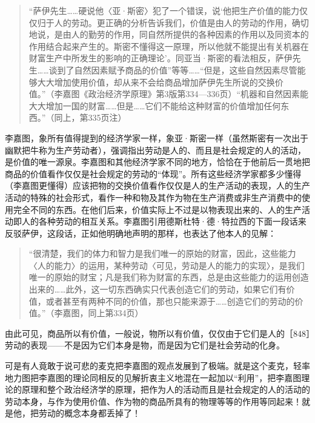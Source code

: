 \begin{quote}{“萨伊先生……硬说他〈亚·斯密〉犯了一个错误，说‘他把生产价值的能力仅仅归于人的劳动。更正确的分析告诉我们，价值是由人的劳动的作用，确切地说，是由人的勤劳的作用，同自然所提供的各种因素的作用以及同资本的作用结合起来产生的。斯密不懂得这一原理，所以他就不能提出有关机器在财富生产中所发生的影响的正确理论’。同亚当·斯密的看法相反，萨伊先生……谈到了自然因素赋予商品的价值”等等……“但是，这些自然因素尽管能够大大增加使用价值，却从来不会给商品增加萨伊先生所说的交换价值。”（李嘉图《政治经济学原理》第3版第334—336页）“机器和自然因素能大大增加一国的财富……但是……它们不能给这种财富的价值增加任何东西。”（同上，第335页注）}\end{quote}

李嘉图，象所有值得提到的经济学家一样，象亚·斯密一样（虽然斯密有一次出于幽默把牛称为生产劳动者），强调指出劳动是人的、而且是社会规定的人的活动，是价值的唯一源泉。李嘉图和其他经济学家不同的地方，恰恰在于他前后一贯地把商品的价值看作仅仅是社会规定的劳动的“体现”。所有这些经济学家都多少懂得（李嘉图更懂得）应该把物的交换价值看作仅仅是人的生产活动的表现，人的生产活动的特殊的社会形式，看作一种和物及其作为物在生产消费或非生产消费中的使用完全不同的东西。在他们后来，价值实际上不过是以物表现出来的、人的生产活动即人的各种劳动的相互关系。李嘉图引用德斯杜特·德·特拉西的下面一段话来反驳萨伊，这段话，正如他明确地声明的那样，也表达了他本人的见解：

\begin{quote}{“很清楚，我们的体力和智力是我们唯一的原始的财富，因此，这些能力〈人的能力〉的运用，某种劳动〈可见，劳动是人的能力的实现〉，是我们唯一的原始的财宝；凡是我们称为财富的东西，总是由这些能力的运用创造出来的……此外，这一切东西确实只代表创造它们的劳动，如果它们有价值，或者甚至有两种不同的价值，那也只能来源于……创造它们的劳动的价值。”（李嘉图，同上第334页）}\end{quote}

由此可见，商品所以有价值，一般说，物所以有价值，仅仅由于它们是人的［848］劳动的表现——不是因为它们本身是物，而是因为它们是社会劳动的化身。

可是有人竟敢于说可悲的麦克把李嘉图的观点发展到了极端。就是这个麦克，轻率地力图把李嘉图的理论同相反的见解折衷主义地混在一起加以“利用”，把李嘉图理论的原理和整个政治经济学的原理，把作为人的活动而且是社会规定的人的活动的劳动本身，与作为使用价值、作为物的商品所具有的物理等等的作用等同起来！就是他，把劳动的概念本身都丢掉了！

